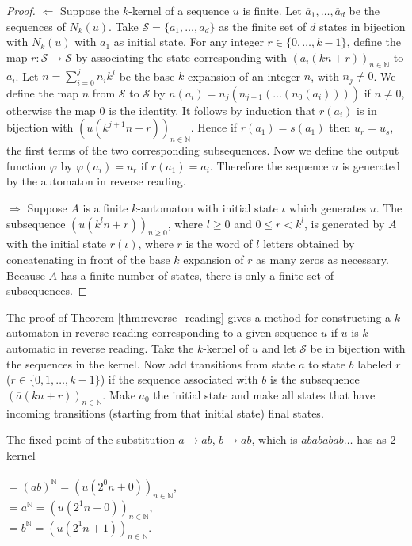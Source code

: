 \documentclass{article}
\begin{document}
\begin{proof}
$\Leftarrow$ Suppose the $k$-kernel of a sequence $u$ is finite. Let
$\overline{a}_1, \ldots, \overline{a}_d$ be the sequences of $N_k(u)$. Take
$\mathcal{S} = \{a_1, \ldots, a_d\}$ as the finite set of $d$ states in 
bijection with $N_k(u)$ with $a_1$ as initial state. For any integer 
$r \in \{0, \ldots, k - 1\}$, define the map $r : \mathcal{S} \to \mathcal{S}$ 
by associating the state corresponding with  
$(\overline{a}_i(kn + r))_{n \in \mathbb{N}}$ to $a_i$. Let 
$n = \sum_{i = 0}^j n_i k^i$ be the base $k$ expansion of an integer $n$, with 
$n_j \ne 0$. We define the map $n$ from
$\mathcal{S}$ to $\mathcal{S}$ by $n(a_i) = n_j(n_{j - 1}( \ldots (n_0(a_i))))$
if $n \ne 0$, otherwise the map 0 is the identity. It follows by induction that
$r(a_i)$ is in bijection with $(u(k^{j + 1} n + r))_{n \in \mathbb{N}}$. 
Hence if $r(a_1) = s(a_1)$ then $u_r = u_s$, the first terms of the
two corresponding subsequences. Now we define the output 
function $\varphi$ by $\varphi(a_i) = u_r$ if 
$r(a_1) = a_i$. Therefore the sequence $u$ is generated by the automaton 
in reverse reading.

$\Rightarrow$ Suppose $A$ is a finite $k$-automaton with initial state $\iota$
which generates $u$. The subsequence $(u(k^ln + r))_{n \ge 0}$, where
$l \ge 0$ and $0 \le r < k^l$, is generated by $A$ with the initial state
$\overline{r}(\iota)$, where $\overline{r}$ is the word of $l$ letters
obtained by concatenating in front of the base $k$ expansion of $r$ as many
zeros as necessary. Because $A$ has a finite number of states, there is only a
finite set of subsequences. 
\end{proof}

The proof of Theorem \ref{thm:reverse_reading} gives a method for constructing 
a $k$-automaton in reverse reading corresponding to a given sequence $u$ if $u$ 
is $k$-automatic in reverse reading. Take the $k$-kernel of $u$ and let 
$\mathcal{S}$ be in bijection with the sequences in the kernel. Now add 
transitions from state $a$ to state $b$ labeled $r$ 
($r \in \{0, 1, \ldots, k - 1\}$) if the sequence associated with $b$ is the 
subsequence $(\overline{a}(kn + r))_{n \in \mathbb{N}}$. Make $a_0$ the initial
state and make all states that have incoming transitions (starting from that 
initial state) final states.

\begin{example} \label{ex:reverse_reading}
The fixed point of the substitution $a \to ab$, $b \to ab$,
which is $abababab\ldots$ has as 2-kernel\\
\\
$= (ab)^\mathbb{N} = (u(2^0 n + 0))_{n \in \mathbb{N}}$,\\
$= a^\mathbb{N} = (u(2^1 n + 0))_{n \in \mathbb{N}}$,\\
$= b^\mathbb{N} = (u(2^1 n + 1))_{n \in \mathbb{N}}$.\\
\end{example}
\end{document}
